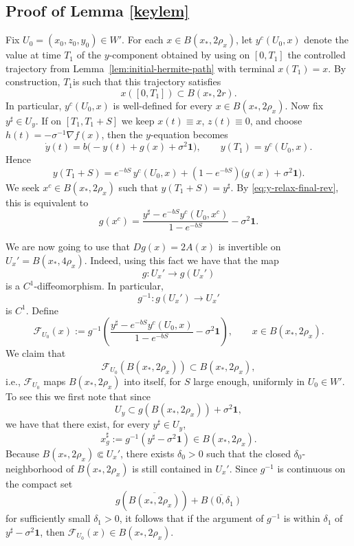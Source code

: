 \documentclass[11pt, a4paper,leqno]{amsart}
\theoremstyle{definition}
\numberwithin{equation}{section}
\begin{document}
\subsection{Proof of Lemma \ref{keylem}}\label{Pr1} Fix \(U_0=(x_0,z_0,y_0)\in W'\). For each \(x\in B(x_\ast,2\rho_x)\), let $y^c(U_0,x)$
denote the value at time \(T_1\) of the \(y\)-component obtained by using on
\([0,T_1]\) the controlled trajectory from Lemma~\ref{lem:initial-hermite-path}
with terminal \(x(T_1)=x\). By construction, $T_1$is such that this trajectory satisfies
\[
x([0,T_1])\subset B(x_\ast,2r).
\]
In particular, \(y^c(U_0,x)\) is well-defined for every
\(x\in B(x_\ast,2\rho_x)\). Now fix \(y^\sharp\in U_y\). If on \([T_1,T_1+S]\) we keep \(x(t)\equiv x\),
\(z(t)\equiv 0\), and choose $h(t)=-\sigma^{-1}\nabla f(x)$,
then the \(y\)-equation becomes
\[
\dot y(t)=b\bigl(-y(t)+g(x)+\sigma^2\mathbf 1\bigr),
\qquad y(T_1)=y^c(U_0,x).
\]
Hence
\begin{equation}\label{eq:y-relax-final-rev}
y(T_1+S)
=
e^{-bS}\,y^c(U_0,x)
+
(1-e^{-bS})\bigl(g(x)+\sigma^2\mathbf 1\bigr).
\end{equation}
We seek \(x^c\in B(x_\ast,2\rho_x)\) such that \(y(T_1+S)=y^\sharp\). By
\eqref{eq:y-relax-final-rev}, this is equivalent to
\begin{equation}\label{eq:implicit-xc-rev}
g(x^c)
=
\frac{y^\sharp-e^{-bS}y^c(U_0,x^c)}{1-e^{-bS}}
-\sigma^2\mathbf 1.
\end{equation}


We are now going to use that \(Dg(x)=2A(x)\) is invertible on \(U_x'=B(x_\ast,4\rho_x)\). Indeed, using this fact we have that the map
\[
g:U_x'\to g(U_x')
\]
is a \(C^1\)-diffeomorphism. In particular,
\[
g^{-1}:g(U_x')\to U_x'
\]
is \(C^1\). Define
\[
\mathcal F_{U_0}(x)
:=
g^{-1}\!\left(
\frac{y^\sharp-e^{-bS}y^c(U_0,x)}{1-e^{-bS}}
-\sigma^2\mathbf 1
\right),
\qquad x\in B(x_\ast,2\rho_x).
\]
We claim that
$$\mathcal F_{U_0}(B(x_\ast,2\rho_x))\subset B(x_\ast,2\rho_x),$$
i.e., \(\mathcal F_{U_0}\) maps \(B(x_\ast,2\rho_x)\) into
itself, for \(S\) large enough, uniformly in \(U_0\in W'\). To see this we first note that since
\[
U_y\subset g(B(x_\ast,2\rho_x))+\sigma^2\mathbf 1,
\]
we have that there exist, for every \(y^\sharp\in U_y\),
\[
x^\sharp_g:=g^{-1}(y^\sharp-\sigma^2\mathbf 1)\in B(x_\ast,2\rho_x).
\]
Because \(B(x_\ast,2\rho_x)\Subset U_x'\), there exists \(\delta_0>0\) such that
the closed \(\delta_0\)-neighborhood of \(B(x_\ast,2\rho_x)\) is still contained
in \(U_x'\). Since \(g^{-1}\) is continuous on the compact set
\[
g(\overline{B(x_\ast,2\rho_x)})+\overline{B(0,\delta_1)}
\]
for sufficiently small \(\delta_1>0\), it follows that if the argument of
\(g^{-1}\) is within \(\delta_1\) of \(y^\sharp-\sigma^2\mathbf 1\), then
\(\mathcal F_{U_0}(x)\in B(x_\ast,2\rho_x)\).
\end{document}
